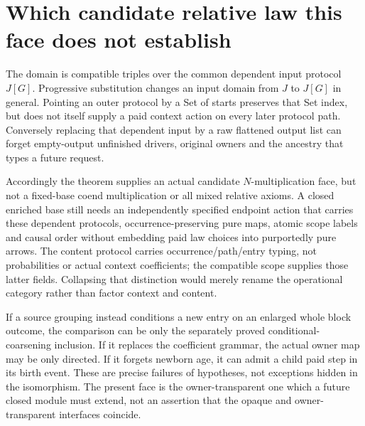 \documentclass[11pt]{article}\usepackage{amsmath,amssymb,amsthm,geometry}\geometry{margin=1in}
\begin{document}
\section{Which candidate relative law this face does not establish}
The domain is compatible triples over the common dependent input protocol $J[G]$. Progressive substitution changes an input domain from $J$ to $J[G]$ in general. Pointing an outer protocol by a Set of starts preserves that Set index, but does not itself supply a paid context action on every later protocol path. Conversely replacing that dependent input by a raw flattened output list can forget empty-output unfinished drivers, original owners and the ancestry that types a future request.

Accordingly the theorem supplies an actual candidate $N$-multiplication face, but not a fixed-base coend multiplication or all mixed relative axioms. A closed enriched base still needs an independently specified endpoint action that carries these dependent protocols, occurrence-preserving pure maps, atomic scope labels and causal order without embedding paid law choices into purportedly pure arrows. The content protocol carries occurrence/path/entry typing, not probabilities or actual context coefficients; the compatible scope supplies those latter fields. Collapsing that distinction would merely rename the operational category rather than factor context and content.

If a source grouping instead conditions a new entry on an enlarged whole block outcome, the comparison can be only the separately proved conditional-coarsening inclusion. If it replaces the coefficient grammar, the actual owner map may be only directed. If it forgets newborn age, it can admit a child paid step in its birth event. These are precise failures of hypotheses, not exceptions hidden in the isomorphism. The present face is the owner-transparent one which a future closed module must extend, not an assertion that the opaque and owner-transparent interfaces coincide.
\end{document}
